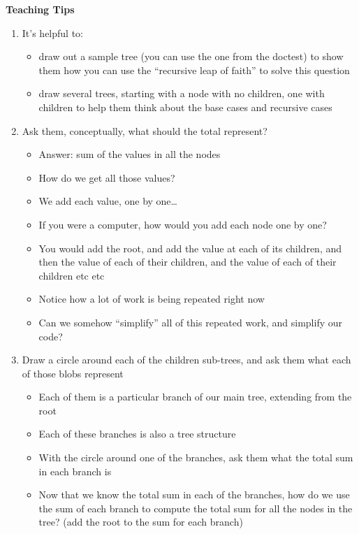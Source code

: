 \begin{blocksection}
	\begin{guide}
	\textbf{Teaching Tips}
	\begin{enumerate}
			\item It’s helpful to:
			\begin{itemize}
				\item draw out a sample tree (you can use the one from the doctest) to show them how you can use the “recursive leap of faith” to solve this question
                \item draw several trees, starting with a node with no children, one with children to help them think about the base cases and recursive cases
			\end{itemize}
			\item Ask them, conceptually, what should the total represent?
			\begin{itemize}
				\item Answer: sum of the values in all the nodes
                \item How do we get all those values?
                \item We add each value, one by one…
                \item If you were a computer, how would you add each node one by one?
                \item You would add the root, and add the value at each of its children, and then the value of each of their children, and the value of each of their children etc etc
                \item Notice how a lot of work is being repeated right now
                \item Can we somehow “simplify” all of this repeated work, and simplify our code?
            \end{itemize}
            \item Draw a circle around each of the children sub-trees, and ask them what each of those blobs represent
            \begin{itemize}
                \item Each of them is a particular branch of our main tree, extending from the root
                \item Each of these branches is also a tree structure
                \item With the circle around one of the branches, ask them what the total sum in each branch is
                \item Now that we know the total sum in each of the branches, how do we use the sum of each branch to compute the total sum for all the nodes in the tree? (add the root to the sum for each branch)

\end{itemize}
\end{enumerate}
\end{guide}
\end{blocksection}
